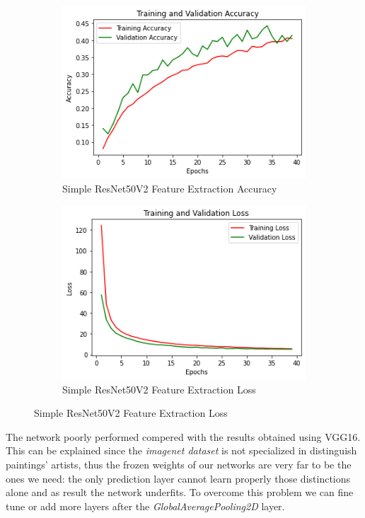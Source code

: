 \begin{figure}[H]
	\begin{subfigure}{0.5\textwidth}
		\includegraphics[width=0.9\linewidth]{img/resnet50v2/resnet50acc.png} 
		\caption{Simple ResNet50V2 Feature Extraction Accuracy}
	\end{subfigure}
	\begin{subfigure}{0.5\textwidth}
		\includegraphics[width=0.9\linewidth]{img/resnet50v2/resnet50loss.png}
		\caption{Simple ResNet50V2 Feature Extraction Loss}
	\end{subfigure}
\end{figure}

The network poorly performed compered with the results obtained using VGG16. This can be explained since the \textit{imagenet dataset} is not specialized in distinguish paintings' artists, thus the frozen weights of our networks are very far to be the ones we need: the only prediction layer cannot learn properly those distinctions alone and as result the network underfits. To overcome this problem we can fine tune or add more layers after the \textit{GlobalAveragePooling2D} layer.

